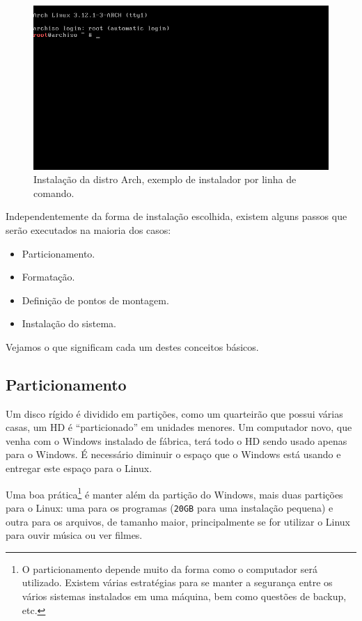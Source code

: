 \documentclass{handout_utfpr}
\begin{document}
\begin{figure}[H]
    \centering
    \includegraphics[scale=.5]{imagens/arch-install-01.png}
    \caption{Instalação da distro Arch, exemplo de instalador por linha de comando.}
    \label{fig:arch-installer}
\end{figure}

Independentemente da forma de instalação escolhida, existem alguns passos que serão executados na maioria dos casos:
\begin{itemize}
\item Particionamento.
\item Formatação.
\item Definição de pontos de montagem.
\item Instalação do sistema.
\end{itemize}

Vejamos o que significam cada um destes conceitos básicos.

\subsection{Particionamento}
Um disco rígido é dividido em partições, como um quarteirão que possui várias casas, um HD é ``particionado'' em unidades menores. Um computador novo, que venha com o Windows instalado de fábrica, terá todo o HD sendo usado apenas para o Windows. É necessário diminuir o espaço que o Windows está usando e entregar este espaço para o Linux.

Uma boa prática\footnote{O particionamento depende muito da forma como o computador será utilizado. Existem várias estratégias para se manter a segurança entre os vários sistemas instalados em uma máquina, bem como questões de backup, etc.} é manter além da partição do Windows, mais duas partições para o Linux: uma para os programas (\texttt{20GB} para uma instalação pequena) e outra para os arquivos, de tamanho maior, principalmente se for utilizar o Linux para ouvir música ou ver filmes.
\end{document}
